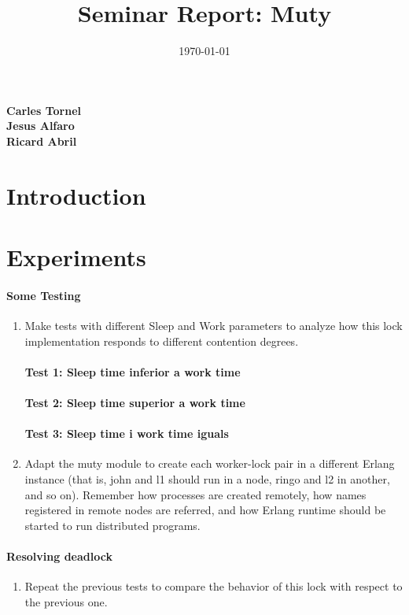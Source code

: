 \documentclass[a4paper, 10pt]{article}
\title{Seminar Report: Muty}
\date{\normalsize\today{}}
\begin{document}
\maketitle

\begin{center}
  \textbf{Carles Tornel}\\
  \textbf{Jesus Alfaro}\\
  \textbf{Ricard Abril}

\end{center}

\section{Introduction}

\newpage
\section{Experiments}
\paragraph[bold]{Some Testing}
\begin{enumerate}
  \item Make tests with different Sleep and Work parameters to analyze how this lock implementation responds to different contention degrees.
\paragraph[bold]{Test 1: Sleep time inferior a work time}
\paragraph[bold]{Test 2: Sleep time superior a work time}
\paragraph[bold]{Test 3: Sleep time i work time iguals}


  \newpage\item Adapt the muty module to create each worker-lock pair in a different Erlang instance (that is, john and l1 should run in a node, ringo and l2 in another, and so on). Remember how processes are created remotely, how names registered in remote nodes are referred, and how Erlang runtime should be started to run distributed programs.  
\end{enumerate}

\paragraph[bold]{Resolving deadlock}
\begin{enumerate}
\item Repeat the previous tests to compare the behavior of this lock with respect to the previous one.
\end{enumerate}
\end{document}
